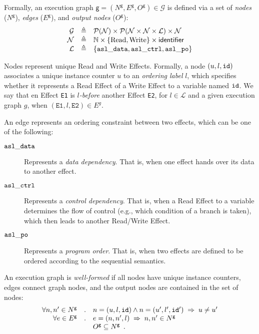 \documentclass{book}
\newcommand\xgraph[0]{\textsf{g}}
\newcommand\Nodes[0]{\mathcal{N}}
\newcommand\Read[0]{\text{Read}}
\newcommand\Write[0]{\text{Write}}
\newcommand\Labels[0]{\mathcal{L}}
\newcommand\XGraphs[0]{\mathcal{G}}
\begin{document}
Formally, an execution graph $\xgraph = (N^\xgraph, E^\xgraph, O^\xgraph) \in \XGraphs$
is defined via a set of \emph{nodes} ($N^\xgraph$), \emph{edges} ($E^\xgraph$), and \emph{output nodes} ($O^\xgraph$):
\[
\begin{array}{rcl}
  \XGraphs   	    &\triangleq& \pow{\Nodes} \times \pow{\Nodes \times \Nodes \times \Labels} \times \Nodes  \\
  \Nodes            &\triangleq& \N \times \{ \Read, \Write \} \times \identifier \\
  \Labels           &\triangleq& \{ \asldata, \aslctrl, \aslpo \}
\end{array}
\]

Nodes represent unique Read and Write Effects. Formally, a node $(u,l,\texttt{id})$ associates a unique instance counter $u$
to an \emph{ordering label} $l$, which specifies whether it represents a Read Effect of a Write Effect to a variable named $\texttt{id}$.
%
We say that en Effect \texttt{E1} is \emph{$l$-before} another Effect \texttt{E2}, for $l\in \Labels$ and a given execution graph
$g$, when $(\texttt{E1}, l, \texttt{E2}) \in E^g$.

An edge represents an ordering constraint between two effects, which can be one of the following:
\begin{description}
\item[$\mathtt{asl\_data}$] Represents a \emph{data dependency}.
That is, when one effect hands over its data to another effect.
\item[$\mathtt{asl\_ctrl}$] Represents a \emph{control dependency}.
That is, when a Read Effect to a variable determines the flow of control (e.g., which condition of a branch is taken),
which then leads to another Read/Write Effect.
\item[$\mathtt{asl\_po}$] Represents a \emph{program order}.
That is, when two effects are defined to be ordered according to the sequential semantics.
\end{description}

An execution graph is \emph{well-formed} if all nodes have unique instance counters, edges connect graph nodes,
and the output nodes are contained in the set of nodes:
\[
  \begin{array}{rcl}
  \forall n, n' \in N^\xgraph &.& n=(u,l,\id) \wedge n=(u',l',\id') \;\Rightarrow\; u \neq u' \\
  \forall e \in E^\xgraph &.& e=(n, n', l) \;\Rightarrow\; n, n' \in N^\xgraph \\
  & & O^\xgraph \subseteq N^\xgraph \enspace.
  \end{array}
\]
\end{document}
